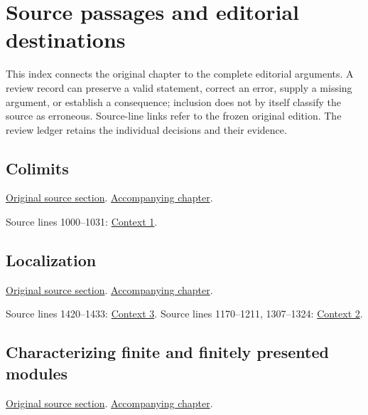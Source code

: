 \section{Source passages and editorial destinations}
This index connects the original chapter to the complete editorial arguments. A review record can preserve a valid statement, correct an error, supply a missing argument, or establish a consequence; inclusion does not by itself classify the source as erroneous. Source-line links refer to the frozen original edition. The review ledger retains the individual decisions and their evidence.

\subsection{Colimits}
\hypertarget{algebra-source-section-colimits}{}
\noindent\href{https://github.com/stacks/stacks-project/blob/a04446e57ec1fbc252a871afcec7752fb2807b14/algebra.tex\#L702}{Original source section}. \href{algebra.pdf\#nameddest=section-colimits}{Accompanying chapter}.

\begin{AlgebraSourceRoutes}
 Source lines 1000--1031: \hyperlink{algebra-context-001}{Context 1}.
\end{AlgebraSourceRoutes}

\subsection{Localization}
\hypertarget{algebra-source-section-localization}{}
\noindent\href{https://github.com/stacks/stacks-project/blob/a04446e57ec1fbc252a871afcec7752fb2807b14/algebra.tex\#L1038}{Original source section}. \href{algebra.pdf\#nameddest=section-localization}{Accompanying chapter}.

\begin{AlgebraSourceRoutes}
 Source lines 1420--1433: \hyperlink{algebra-context-003}{Context 3}.
 Source lines 1170--1211, 1307--1324: \hyperlink{algebra-context-002}{Context 2}.
\end{AlgebraSourceRoutes}

\subsection{Characterizing finite and finitely presented modules}
\hypertarget{algebra-source-section-colim-and-hom}{}
\noindent\href{https://github.com/stacks/stacks-project/blob/a04446e57ec1fbc252a871afcec7752fb2807b14/algebra.tex\#L1580}{Original source section}. \href{algebra.pdf\#nameddest=section-colim-and-hom}{Accompanying chapter}.

